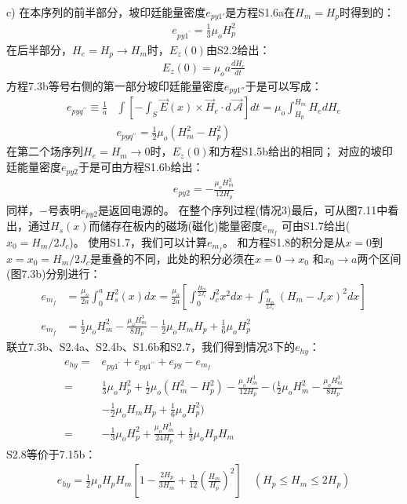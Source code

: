 c) 在本序列的前半部分，坡印廷能量密度$e_{py1'}$是方程S1.6a在$H_m=H_p$时得到的：
\begin{align*}%
e_{py1^\prime}=\frac{1}{3}\mu_oH_{p}^{2} \tag{S2.4a}
\end{align*}
在后半部分，$H_e=H_p\rightarrow H_m$时，$E_z(0)$由S2.2给出：
\begin{align*}%
E_z(0)=\mu_oa\frac{dH_e}{dt}  \tag{S2.5}
\end{align*}
方程7.3b等号右侧的第一部分坡印廷能量密度$e_{py1''}$于是可以写成：
\begin{align*}%
e_{pyq^{\prime\prime}}\equiv\frac{1}{a}&\int\left[-\int_{S}\vec{E}(x)\times\vec{H}_e\cdot d\vec{\ \mathcal{A}}\right]dt=\mu_o\int_{H_p}^{H_m}H_edH_e\\
&e_{pyq^{\prime\prime}}=\frac{1}{2}\mu_o(H_{m}^{2}-H_{p}^{2}) \tag{S2.4b}
\end{align*}
在第二个场序列$H_e=H_m\rightarrow 0$时，$E_z(0)$和方程S1.5b给出的相同；
对应的坡印廷能量密度$e_{py2}$于是可由方程S1.6b给出：
\begin{align*}%
e_{py2}=-\frac{\mu_oH_{m}^{3}}{12H_p} \tag{S1.6b}
\end{align*}
同样，$-$号表明$e_{py2}$是返回电源的。
在整个序列过程(情况3)最后，可从图7.11中看出，通过$H_s(x)$而储存在板内的磁场(磁化)能量密度$e_{m_f}$
可由S1.7给出($x_0=H_m/2 J_c$)。
使用S1.7，我们可以计算$e_{m_f}$。
和方程S1.8的积分是从$x=0$到$x=x_0=H_m/2J_c$是重叠的不同，此处的积分必须在$x=0\rightarrow x_0$
和$x_0\rightarrow a$两个区间(图7.3b)分别进行：
\begin{align*}%
e_{m_f}&=\frac{\mu_o}{2a}\int_{0}^{a}H_{s}^{2}(x)dx=\frac{\mu_o}{2a}\left[\int_{0}^{\frac{H_m}{2J_c}}J_{c}^{2}x^2dx+\int_{\frac{H_m}{2J_c}}^{a}(H_m-J_cx)^2dx\right]\\
e_{m_f}&=\frac{1}{2}\mu_oH_{m}^{2}-\frac{\mu_oH_{m}^{3}}{8H_p}-\frac{1}{2}\mu_oH_mH_p+\frac{1}{6}\mu_oH_{p}^{2}\tag{S2.7}
\end{align*}
联立7.3b、S2.4a、S2.4b、S1.6b和S2.7，我们得到情况3下的$e_{hy}$：
\begin{align*}%
e_{hy}=&e_{py1^\prime}+e_{py1^{\prime\prime}}+e_{py}-e_{m_f} \\
=&\frac{1}{3}\mu_oH_{p}^{2}+\frac{1}{2}\mu_o(H_{m}^{2}-H_{p}^{2})-\frac{\mu_oH_{m}^{3}}{12H_p} 
-\big(\frac{1}{2}\mu_oH_{m}^{2}-\frac{\mu_oH_{m}^{3}}{8H_p}\\
&-\frac{1}{2}\mu_oH_mH_p+\frac{1}{6}\mu_oH_{p}^{2}\big) \\
=&-\frac{1}{3}\mu_oH_{p}^{2}+\frac{\mu_oH_{m}^{3}}{24H_p}+\frac{1}{2}\mu_oH_pH_m \tag{S2.8}
\end{align*}
S2.8等价于7.15b：
\begin{align*}%
e_{hy}=\frac{1}{2}\mu_oH_pH_m\left[1-\frac{2H_p}{3H_m}+\frac{1}{12}\left(\frac{H_m}{H_p}\right)^2\right] \quad (H_p\leq H_m\leq 2H_p) \tag{7.15b}
\end{align*}


